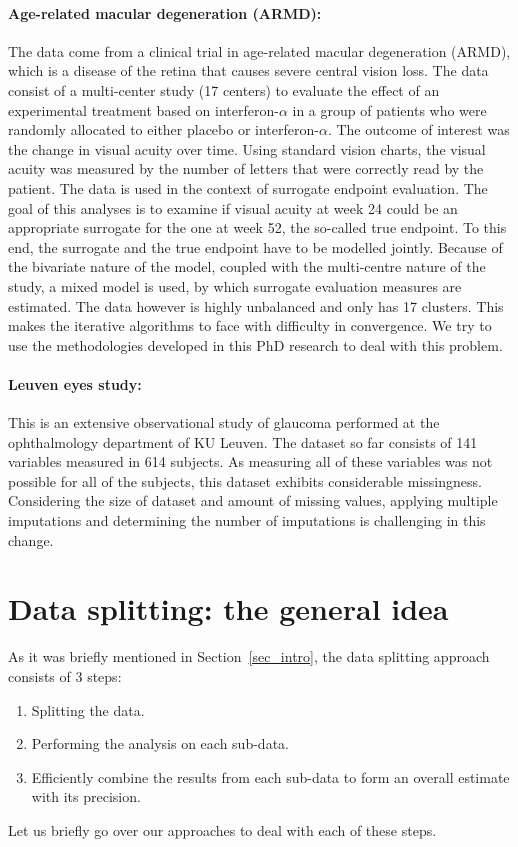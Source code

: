 \documentclass[14pt]{article}
\begin{document}
\paragraph*{Age-related macular degeneration (ARMD):} The data come from a clinical trial in age-related macular degeneration (ARMD), which is a disease of the retina that causes severe central vision loss. The data consist of a multi-center study (17 centers) to evaluate the effect of an experimental treatment based on interferon-$\alpha$ in a group of patients who were randomly allocated to either placebo or interferon-$\alpha$. The outcome of interest was the change in visual acuity over time. Using standard vision charts, the visual acuity was measured by the number of letters that were correctly read by the patient. The data is used in the context of surrogate endpoint evaluation. The goal of this analyses is to examine if  visual acuity at week 24 could be an appropriate surrogate for the one at week 52, the so-called true endpoint. To this end, the surrogate and the true endpoint have to be modelled jointly. Because of the bivariate nature of the model, coupled with the multi-centre nature of the study, a mixed model is used, by which surrogate evaluation measures are estimated. The data however is highly unbalanced and only has 17 clusters. This makes the iterative algorithms to face with difficulty in convergence. We try to use the methodologies developed in this PhD research to deal with this problem.

\paragraph*{Leuven eyes study:} This is an extensive observational study of glaucoma performed at the ophthalmology department of KU Leuven. The dataset so far consists of 141 variables measured in 614 subjects. As measuring all of these variables was not possible for all of the subjects, this dataset exhibits considerable missingness. Considering the size of dataset and amount of missing values, applying multiple imputations and determining the number of imputations is challenging in this change. 

\section{Data splitting: the general idea}
\label{sec_idea}
As it was briefly mentioned in Section~\ref{sec_intro}, the data splitting approach consists of 3 steps:
\begin{enumerate}
\item Splitting the data.
\item Performing the analysis on each sub-data.
\item Efficiently combine the results from each sub-data to form an overall estimate with its precision.
\end{enumerate}
Let us briefly go over our approaches to deal with each of these steps. 
\end{document}
